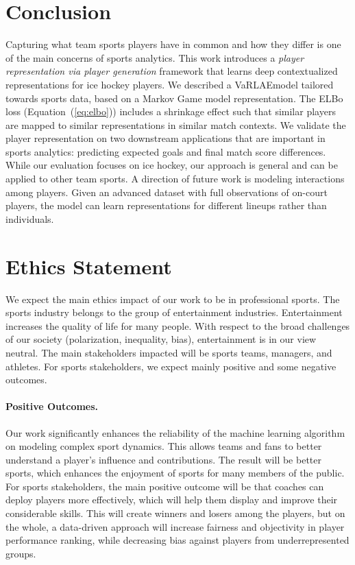 \documentclass[letterpaper]{article} %
\newcommand{\system}{VaRLAE\;}
\begin{document}
\section{Conclusion}
Capturing what team sports players have in common and how they differ is one of the main concerns of sports analytics. This work introduces a {\it player representation via player generation} framework that learns deep contextualized representations for ice hockey players. We described a \system model tailored towards sports data, based on a Markov Game model representation. The ELBo loss (Equation~(\ref{eq:elbo})) includes a shrinkage effect such that similar players are mapped to similar representations in similar match contexts. We validate the player representation on two downstream applications that are important in sports analytics: predicting expected goals and final match score differences. While our evaluation focuses on ice hockey, our approach is general and can be applied to other team sports. A direction of future work is modeling interactions among players. Given an advanced dataset with full observations of on-court players, the model can learn representations for different lineups rather than individuals.

\section{Ethics Statement}
We expect the main ethics impact of our work to be in professional sports. The sports industry belongs to the group of entertainment industries.  Entertainment increases the quality of life for many people. With respect to the broad challenges of our society (polarization, inequality, bias), entertainment is in our view neutral. The main stakeholders impacted will be sports teams, managers, and athletes. For sports stakeholders, we expect mainly positive and some negative outcomes. 

\paragraph{Positive Outcomes.} Our work significantly enhances the reliability of the machine learning algorithm on modeling complex sport dynamics. This allows teams and fans to better understand a player's influence and contributions. The result will be better sports, which enhances the enjoyment of sports for many members of the public. 
For sports stakeholders, the main positive outcome will be that coaches can deploy players more effectively, which will help them display and improve their considerable skills. This will create winners and losers among the players, but on the whole, a data-driven approach will increase fairness and objectivity in player performance ranking, while decreasing bias against players from underrepresented groups. 
\end{document}
